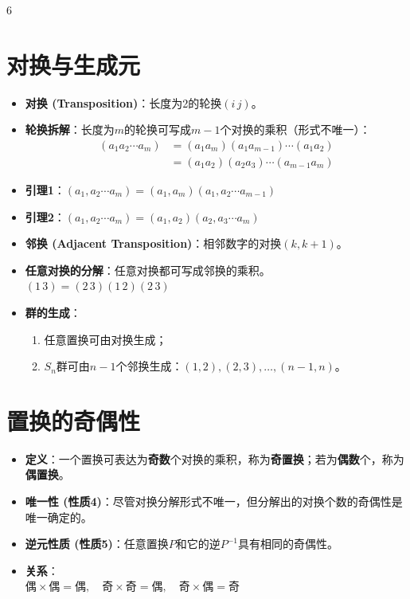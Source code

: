 \documentclass[landscape]{article}
\begin{document}
\begin{multicols*}{6}
\section*{对换与生成元}
\begin{itemize}
  \item \textbf{对换 (Transposition)}：长度为2的轮换$(i\,j)$。
  \item \textbf{轮换拆解}：{\color{red}长度为$m$的轮换可写成$m-1$个对换的乘积}（形式不唯一）：
  \begin{align*}
  (a_1 a_2 \cdots a_m) &= (a_1 a_m)(a_1 a_{m-1})\cdots(a_1 a_2) \\
                       &= (a_1 a_2)(a_2 a_3)\cdots(a_{m-1} a_m)
  \end{align*}
  \item \textbf{引理1}：$(a_1, a_2 \cdots a_m) = (a_1, a_m)(a_1, a_2 \cdots a_{m-1})$
  \item \textbf{引理2}：$(a_1, a_2 \cdots a_m) = (a_1, a_2)(a_2, a_3 \cdots a_m)$
  \item \textbf{邻换 (Adjacent Transposition)}：相邻数字的对换$(k, k+1)$。
  \item \textbf{任意对换的分解}：{\color{red}任意对换都可写成邻换的乘积}。
  \\ $ (1\,3) = (2\,3)(1\,2)(2\,3) $
  \item \textbf{群的生成}：
  \begin{enumerate}
      \item 任意置换可由对换生成；
      \item $S_n$群可由$n-1$个邻换生成：$(1,2), (2,3), \dots, (n-1, n)$。
  \end{enumerate}
\end{itemize}

\section*{置换的奇偶性}
\begin{itemize}
  \item \textbf{定义}：一个置换可表达为\textbf{奇数}个对换的乘积，称为\textbf{奇置换}；若为\textbf{偶数}个，称为\textbf{偶置换}。
  \item \textbf{唯一性 (性质4)}：{\color{red}尽管对换分解形式不唯一，但分解出的对换个数的奇偶性是唯一确定}的。
  \item \textbf{逆元性质 (性质5)}：{\color{red}任意置换$P$和它的逆$P^{-1}$具有相同的奇偶性}。
  \item \textbf{关系}：
  \\ $ \text{偶} \times \text{偶} = \text{偶}, \quad \text{奇} \times \text{奇} = \text{偶}, \quad \text{奇} \times \text{偶} = \text{奇} $
\end{itemize}


\end{multicols*}
\end{document}
